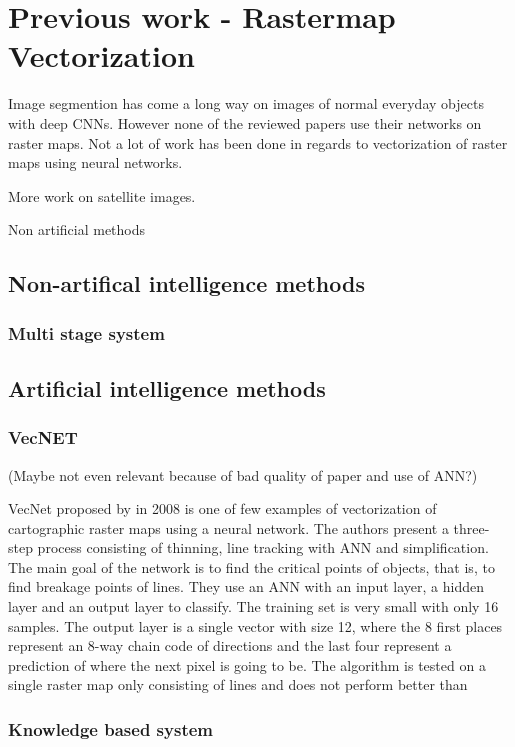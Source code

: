 \chapter{Previous work - Rastermap Vectorization}
Image segmention has come a long way on images of normal everyday objects with deep CNNs. However none of the reviewed papers use their networks on raster maps. Not a lot of work has been done in regards to vectorization of raster maps using neural networks. 

More work on satellite images.

Non artificial methods 

\section{Non-artifical intelligence methods}
\subsection{Multi stage system}
\cite{Oka2012}


\section{Artificial intelligence methods}

\subsection{VecNET}
(Maybe not even relevant because of bad quality of paper and use of ANN?)

VecNet proposed by \citeauthor{Karabork2008} in 2008 is one of few examples of vectorization of cartographic raster maps using a neural network. The authors present a three-step process consisting of thinning, line tracking with ANN and simplification. The main goal of the network is to find the critical points of objects, that is, to find breakage points of lines.
They use an ANN with an input layer, a hidden layer and an output layer to classify. The training set is very small with only 16 samples. The output layer is a single vector with size 12, where the 8 first places represent an 8-way chain code of directions and the last four represent a prediction of where the next pixel is going to be. The algorithm is tested on a single raster map only consisting of lines and does not perform better than 

\subsection{Knowledge based system}
\cite{Lee2000}

\cite{Song2000}


